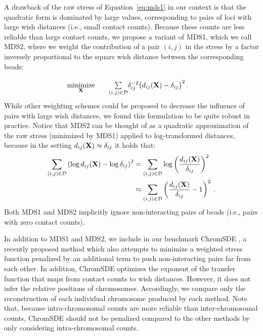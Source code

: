 A drawback of the raw stress of Equation~\ref{eq:mds1} in our context is that the
quadratic form is dominated by large values, corresponding to pairs of loci
with large wish distances (i.e., small contact counts). Because these counts are
less reliable than large contact counts, we propose a variant of MDS1, which
we call MDS2, where we weight the contribution of a pair $(i,j)$ in the stress
by a factor inversely proportional to the square wish distance between the corresponding
beads:
\begin{equation}\label{eq:mds2}
\renewcommand{\arraystretch}{2}
\begin{array}{ccll}
\underset{\mathbf{X}}{\text{minimize}} & &
\underset{(i,j) \in \mathcal{D}}{\sum} \delta_{ij}^{-2} \big(d_{ij}(\Xb) - \delta_{ij}\big)^2 \,.&\\
\end{array}
\end{equation}
While other weighting schemes could be proposed to decrease the influence of
pairs with large wish distances, we found this formulation to be quite robust
in practice. Notice that MDS2 can be thought of as a quadratic approximation of
the raw stress (minimized by MDS1) applied to log-transformed distances, because
in the setting $d_{ij}(\textbf{X}) \approx \delta_{ij}$ it holds that:
\begin{equation*}
\begin{split}
\sum_{(i,j) \in \mathcal{D}} \left(\log d_{ij}(\textbf{X}) - \log \delta_{ij}\right)^2
& = \sum_{(i,j) \in \mathcal{D}} \log\left(\frac{d_{ij}(\textbf{X})}{\delta_{ij}}\right)^2 \\
& \approx \sum_{(i,j) \in \mathcal{D}} \left( \frac{d_{ij}(\textbf{X})}{\delta_{ij}}-1\right)^2 \,.
\end{split}
\end{equation*}
Both MDS1 and MDS2 implicitly
ignore non-interacting pairs of beads (i.e., pairs with zero contact
counts).

In addition to MDS1 and MDS2, we include in our benchmark ChromSDE
\citep{zhang:inference}, a recently proposed method which also attempts to
minimize a weighted stress function penalized by an additional term to push
non-interacting pairs far from each other. In addition, ChromSDE optimizes the
exponent of the transfer function that maps from contact counts to
wish distances. However, it
does not infer the relative positions of chromosomes. Accordingly, we compare
only the reconstruction of each individual chromosome produced by each method. Note
that, because intra-chromosomal counts are more reliable than inter-chromosomal
counts, ChromSDE should not be penalized compared to the other methods by
only considering intra-chromosomal counts.


